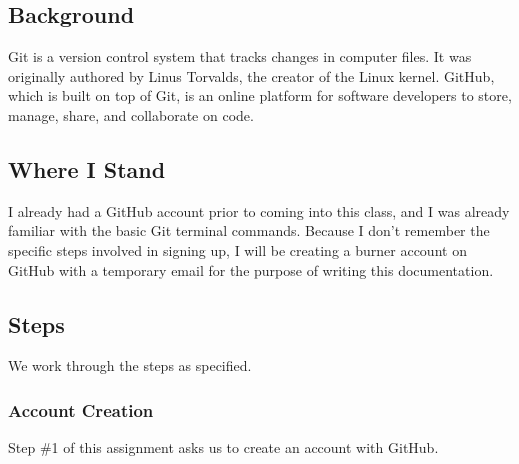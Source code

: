 \documentclass{article}
\begin{document}

\subsection{Background}

Git is a version control system that tracks changes in computer files.  It was
originally authored by Linus Torvalds, the creator of the Linux kernel. GitHub,
which is built on top of Git, is an online platform for software developers to
store, manage, share, and collaborate on code.


\subsection{Where I Stand}

I already had a GitHub account prior to coming into this class, and I was
already familiar with the basic Git terminal commands. Because I don't remember
the specific steps involved in signing up, I will be creating a burner account
on GitHub with a temporary email for the purpose of writing this documentation.


\subsection{Steps}

We work through the steps as specified.

\subsubsection{Account Creation}

Step \#1 of this assignment asks us to create an account with GitHub.
\end{document}
